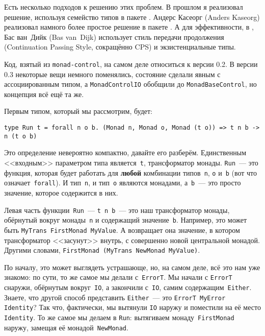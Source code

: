 Есть несколько подходов к решению этих проблем. В прошлом я реализовал решение,
используя семейство типов в пакете
.
Андерс Касеорг (Anders Kaseorg) реализовал намного более простое решение в пакете
.
А для эффективности, в
,
Бас ван~Дийк (Bas van~Dijk) использует стиль передачи продолжения (Continuation Passing Style,
сокращённо CPS) и экзистенциальные типы.

\begin{remark}
    Код, взятый из \texttt{monad-control}, на самом деле относиться к версии
    0.2. В версии 0.3 некоторые вещи немного поменялись, состояние сделали
    явным с ассоциированным типом, а \lstinline'MonadControlIO' обобщили до
    \lstinline'MonadBaseControl', но концепция всё ещё та же.
\end{remark}

Первым типом, который мы рассмотрим, будет:

\begin{lstlisting}
type Run t = forall n o b. (Monad n, Monad o, Monad (t o)) => t n b -> n (t o b)
\end{lstlisting}

Это определение невероятно компактно, давайте его разберём. Единственным
<<входным>> параметром типа является~\lstinline't', трансформатор монады.
\lstinline'Run'~--- это функция, которая будет работать для \textbf{любой} комбинации
типов~\lstinline'n', \lstinline'o' и~\lstinline'b' (вот что
означает~\lstinline'forall'). И тип~\lstinline'n', и тип~\lstinline'o' являются
монадами, а~\lstinline'b'~--- это просто значение, которое содержится в них.

Левая часть функции~\lstinline'Run'~--- \lstinline't n b'~--- это наш
трансформатор монады, обёрнутый вокруг монады~\lstinline'n' и содержащий
значение~\lstinline'b'. Например, это может быть
\lstinline'MyTrans FirstMonad MyValue'.
А возвращает она значение, в котором трансформатор <<засунут>> внутрь, с
совершенно новой центральной монадой. Другими словами,
\lstinline'FirstMonad (MyTrans NewMonad MyValue)'.

По началу, это может выглядеть устрашающе, но, на самом деле, всё это нам уже
знакомо: по сути, то же самое мы делали с~\lstinline'ErrorT'. Мы начали с
\lstinline'ErrorT' снаружи, обёрнутым вокруг~\lstinline'IO', а закончили
с~\lstinline'IO', самим содержащим~\lstinline'Either'. Знаете, что другой
способ представить \lstinline'Either'~--- это
\lstinline'ErrorT MyError Identity'? Так что, фактически, мы вытянули
\lstinline'IO' наружу и поместили на её место \lstinline'Identity'. То же самое
мы делаем в \lstinline'Run': вытягиваем монаду~\lstinline'FirstMonad' наружу,
замещая её монадой~\lstinline'NewMonad'.

